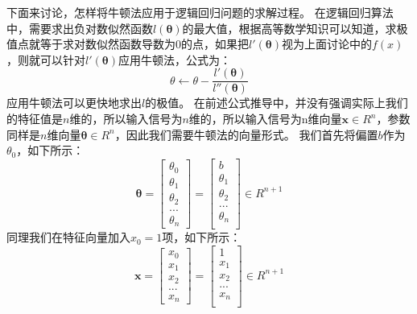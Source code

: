\documentclass[UTF8]{article}
\begin{document}
下面来讨论，怎样将牛顿法应用于逻辑回归问题的求解过程。\newline
在逻辑回归算法中，需要求出负对数似然函数$l(\boldsymbol{\theta})$的最大值，根据高等数学知识可以知道，求极值点就等于求对数似然函数导数为0的点，如果把$l'(\boldsymbol{\theta})$视为上面讨论中的$f(x)$，则就可以针对$l'(\boldsymbol{\theta})$应用牛顿法，公式为：
\begin{equation}
\theta \leftarrow \theta - \frac{l'(\boldsymbol{\theta})}{l''(\boldsymbol{\theta})}
\label{lcrn-nll-newton-method}
\end{equation}
应用牛顿法可以更快地求出$l$的极值。\newline
在前述公式推导中，并没有强调实际上我们的特征值是$n$维的，所以输入信号为$n$维的，所以输入信号为n维向量$\boldsymbol{x} \in R^{n}$，参数同样是$n$维向量$\boldsymbol{\theta} \in R^{n}$，因此我们需要牛顿法的向量形式。\newline
我们首先将偏置$b$作为$\theta _{0}$，如下所示：
\begin{equation}
\boldsymbol{\theta} = \begin{bmatrix}
\theta _{0} \\
\theta _{1} \\
\theta _{2} \\
...\\
\theta _{n}
\end{bmatrix} = \begin{bmatrix}
b \\
\theta _{1} \\
\theta _{2} \\
... \\
\theta _{n} \\
\end{bmatrix} \in R^{n+1}
\label{lcrn-theta-modified-for-newton-vector-method}
\end{equation}
同理我们在特征向量加入$x_{0}=1$项，如下所示：
\begin{equation}
\boldsymbol{x} = \begin{bmatrix}
x _{0} \\
x _{1} \\
x _{2} \\
...\\
x _{n}
\end{bmatrix} = \begin{bmatrix}
1 \\
x _{1} \\
x _{2} \\
... \\
x _{n} \\
\end{bmatrix} \in R^{n+1}
\label{lcrn-x-modified-for-newton-vector-method}
\end{equation}
\end{document}
